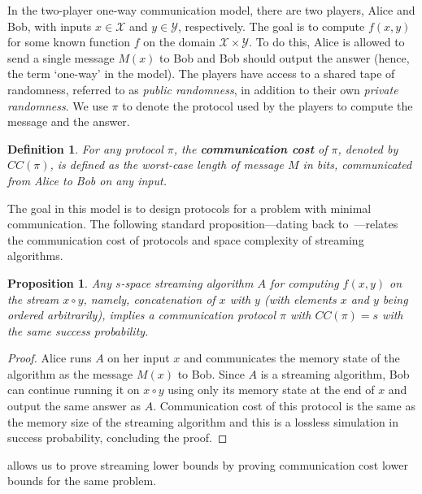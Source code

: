\documentclass[11pt]{article}
\newtheorem{proposition}[lemma]{Proposition}
\newtheorem{definition}[lemma]{Definition}
\theoremstyle{definition}
\begin{document}
In the two-player one-way communication model, there are two players, Alice and Bob, with inputs $x\in \mathcal{X}$ and $y \in \mathcal{Y}$, respectively. The goal is to compute
$f(x,y)$ for some known function $f$ on the domain $\mathcal{X} \times \mathcal{Y}$. To do this, Alice is allowed to send a single message $M(x)$ to Bob 
and Bob should output the answer (hence, the term `one-way' in the model). The players have access to a shared tape of randomness, referred to as \textit{public randomness}, in addition to their own \emph{private randomness}.
We use $\pi$ to denote the protocol used by the players to compute the message and the answer. 

\begin{definition}
    For any protocol $\pi$, the \textnormal{\textbf{communication cost}} of $\pi$, denoted by $CC(\pi)$, is defined as the worst-case length of message $M$ in bits, communicated from Alice to Bob on any input.
\end{definition}

The goal in this model is to design protocols for a problem with minimal communication. The following standard proposition---dating back to~\cite{AlonMS96}---relates the communication cost of protocols and space complexity of streaming algorithms. 

\begin{proposition}\label{prop:stream-cc}
	Any $s$-space streaming algorithm $A$ for computing $f(x,y)$ on the stream $x \circ y$, namely, concatenation of $x$ with $y$ (with elements $x$ and $y$ being ordered arbitrarily), implies a communication
	protocol $\pi$ with $CC(\pi) = s$ with the same success probability. 
\end{proposition}
\begin{proof}
	Alice runs $A$ on her input $x$ and communicates the memory state of the algorithm as the message $M(x)$ to Bob. Since $A$ is a streaming algorithm, Bob can continue running it on $x \circ y$ 
	using only its memory state at the end of $x$ and output the same answer as $A$. Communication cost of this protocol is the same as the memory size of the streaming algorithm and this is a lossless simulation in success probability, 
	concluding the proof. 
\end{proof}

 allows us to prove streaming lower bounds by proving communication cost lower bounds for the same problem. 
\end{document}
